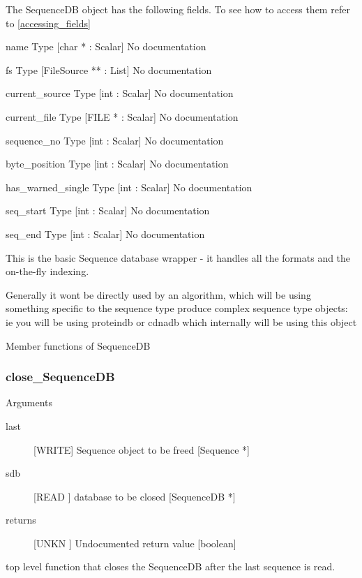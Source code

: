 The SequenceDB object has the following fields. To see how to access them refer to \ref{accessing_fields}
\begin{description}
\item{name} Type [char * : Scalar] No documentation

\item{fs} Type [FileSource ** : List] No documentation

\item{current_source} Type [int : Scalar] No documentation

\item{current_file} Type [FILE * : Scalar] No documentation

\item{sequence_no} Type [int : Scalar] No documentation

\item{byte_position} Type [int : Scalar] No documentation

\item{has_warned_single} Type [int : Scalar] No documentation

\item{seq_start} Type [int : Scalar] No documentation

\item{seq_end} Type [int : Scalar] No documentation

\end{description}
This is the basic Sequence database
wrapper - it handles all the formats
and the on-the-fly indexing.


Generally it wont be directly used by
an algorithm, which will be using something
specific to the sequence type produce complex 
sequence type objects: ie you will be using
proteindb or cdnadb which internally
will be using this object




Member functions of SequenceDB

\subsubsection{close_SequenceDB}

Arguments
\begin{description}
\item[last] [WRITE] Sequence object to be freed  [Sequence *]
\item[sdb] [READ ] database to be closed [SequenceDB *]
\item[returns] [UNKN ] Undocumented return value [boolean]
\end{description}
top level function that closes the SequenceDB
after the last sequence is read.


